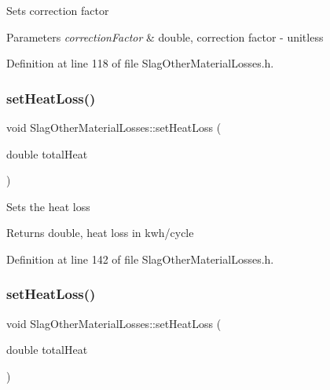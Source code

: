 Sets correction factor 
\begin{DoxyParams}{Parameters}
{\em correction\+Factor} & double, correction factor -\/ unitless \\
\hline
\end{DoxyParams}


Definition at line 118 of file Slag\+Other\+Material\+Losses.\+h.

\mbox{\label{class_slag_other_material_losses_a33d59aed5492ec2912615e93b6ff273e}} 
\subsubsection{\texorpdfstring{set\+Heat\+Loss()}{setHeatLoss()}\hspace{0.1cm}{\footnotesize\ttfamily [1/3]}}
{\footnotesize\ttfamily void Slag\+Other\+Material\+Losses\+::set\+Heat\+Loss (\begin{DoxyParamCaption}\item[{double}]{total\+Heat }\end{DoxyParamCaption})\hspace{0.3cm}{\ttfamily [inline]}}

Sets the heat loss \begin{DoxyReturn}{Returns}
double, heat loss in kwh/cycle 
\end{DoxyReturn}


Definition at line 142 of file Slag\+Other\+Material\+Losses.\+h.

\mbox{\label{class_slag_other_material_losses_a33d59aed5492ec2912615e93b6ff273e}} 
\subsubsection{\texorpdfstring{set\+Heat\+Loss()}{setHeatLoss()}\hspace{0.1cm}{\footnotesize\ttfamily [2/3]}}
{\footnotesize\ttfamily void Slag\+Other\+Material\+Losses\+::set\+Heat\+Loss (\begin{DoxyParamCaption}\item[{double}]{total\+Heat }\end{DoxyParamCaption})\hspace{0.3cm}{\ttfamily [inline]}}

